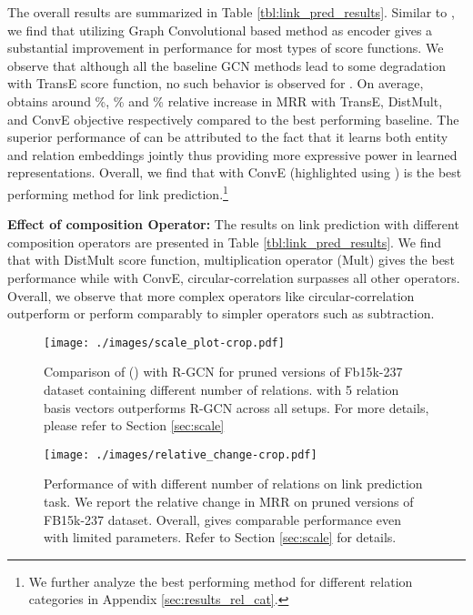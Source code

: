 \documentclass{article} \usepackage{iclr2020_conference,times}
\begin{document}
The overall results are summarized in Table \ref{tbl:link_pred_results}. Similar to \citet{r_gcn}, we find that utilizing Graph Convolutional based method as encoder gives a substantial improvement in performance for most types of score functions. We observe that although all the baseline GCN methods lead to some degradation with TransE score function, no such behavior is observed for \method{}. On average, \method{} obtains around \%, \% and \% relative increase in MRR with TransE, DistMult, and ConvE objective respectively compared to the best performing baseline. The superior performance of \method{} can be attributed to the fact that it learns both entity and relation embeddings jointly thus providing more expressive power in learned representations. Overall, we find that \method{} with ConvE (highlighted using \boxed{\cdot}) is the best performing method for link prediction.\footnote{We further analyze the best performing method for different relation categories in Appendix \ref{sec:results_rel_cat}.}

\noindent \textbf{Effect of composition Operator:} 
The results on link prediction with different composition operators are presented in Table \ref{tbl:link_pred_results}. 
We find that with DistMult score function, multiplication operator (Mult) gives the best performance while with ConvE, circular-correlation surpasses all other operators. Overall, we observe that more complex operators like circular-correlation outperform or perform comparably to simpler operators such as subtraction. 

\label{sec:scale}
\begin{figure*}[t]
	\centering
	\begin{minipage}{.485\textwidth}
		\centering
		\texttt{[image: ./images/scale\_plot-crop.pdf]}
		\caption{\label{fig:rgcn_compare} \small Comparison of \method{} () with R-GCN for pruned versions of Fb15k-237 dataset containing different number of relations. \method{} with 5 relation basis vectors outperforms R-GCN across all setups. For more details, please refer to Section \ref{sec:scale}}
	\end{minipage} \quad
	\begin{minipage}{0.47\textwidth}
		\centering
		\texttt{[image: ./images/relative\_change-crop.pdf]}
		\caption{\label{fig:scale_plot} \small Performance of \method{} with different number of relations on link prediction task. We report the relative change in MRR on pruned versions of FB15k-237 dataset. Overall, \method{} gives comparable performance even with limited parameters. Refer to Section \ref{sec:scale} for details.}
	\end{minipage} \vspace{-4mm}
\end{figure*}
\end{document}
